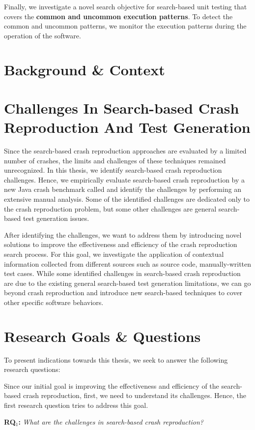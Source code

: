 Finally, we investigate a novel search objective for search-based unit testing that covers the \textbf{common and uncommon execution patterns}. To detect the common and uncommon patterns, we monitor the execution patterns during the operation of the software.

\section{Background \& Context}


\section{Challenges In Search-based Crash Reproduction And Test Generation}
Since the search-based crash reproduction approaches are evaluated by a limited number of crashes, the limits and challenges of these techniques remained unrecognized.
In this thesis, we identify search-based crash reproduction challenges. Hence, we empirically evaluate search-based crash reproduction by a new Java crash benchmark called \jcrashpack and identify the challenges by performing an extensive manual analysis. Some of the identified challenges are dedicated only to the crash reproduction problem, but some other challenges are general search-based test generation issues.

After identifying the challenges, we want to address them by introducing novel solutions to improve the effectiveness and efficiency of the crash reproduction search process. For this goal, we investigate the application of contextual information collected from different sources such as source code, manually-written test cases. While some identified challenges in search-based crash reproduction are due to the existing general search-based test generation limitations, we can go beyond crash reproduction and introduce new search-based techniques to cover other specific software behaviors.

\section{Research Goals \& Questions}
To present indications towards this thesis, we seek to answer the following research questions:

Since our initial goal is improving the effectiveness and efficiency of the search-based crash reproduction, first, we need to understand its challenges. Hence, the first research question tries to address this goal.
\begin{framed}
\quad\textbf{RQ$_1$: } \textit{What are the challenges in search-based crash reproduction?}
\end{framed}

